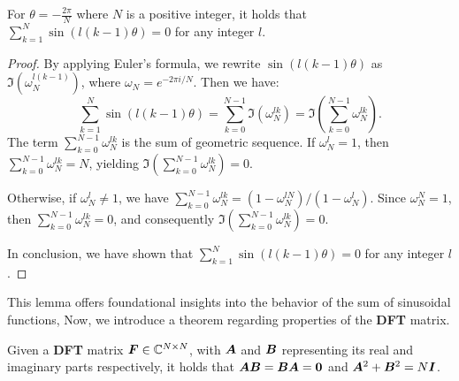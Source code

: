 \begin{lemma}
\label{lemma:1}
    For $\theta=-\frac{2\pi}{N}$ where $N$ is a positive integer, it holds that $\sum_{k=1}^{N}\sin\left(l\left(k-1\right)\theta\right)=0$ for any integer $l$.
\end{lemma}
\begin{proof}
By applying Euler's formula, we rewrite $\sin\left(l\left(k-1\right)\theta\right)$ as $\Im\left(\omega_N^{l(k-1)}\right)$, where $\omega_N=e^{-2\pi i/N}$. Then we have:
\begin{equation}
    \sum_{k=1}^{N} \sin\left(l\left(k-1\right)\theta\right) =\sum_{k=0}^{N-1} \Im \left(\omega_N^{lk}\right) = \Im \left( \sum_{k=0}^{N-1} \omega_N^{lk}\right).
\end{equation}
The term $\sum_{k=0}^{N-1} \omega_N^{lk}$ is the sum of geometric sequence. 
If $\omega_N^{l} = 1$, then $\sum_{k=0}^{N-1} \omega_N^{lk} = N$, yielding $\Im \left( \sum_{k=0}^{N-1} \omega_N^{lk}\right)=0$.

Otherwise, if $\omega_N^{l} \ne 1$, we have $\sum_{k=0}^{N-1} \omega_N^{lk} = \left(1-\omega_N^{lN}\right)/\left(1-\omega_N^{l}\right)$. Since $\omega_N^{N}=1$, then $\sum_{k=0}^{N-1} \omega_N^{lk} = 0$, and consequently $\Im \left( \sum_{k=0}^{N-1} \omega_N^{lk}\right)=0$.

In conclusion, we have shown that $\sum_{k=1}^{N} \sin\left(l\left(k-1\right)\theta\right)=0$ for any integer $l$.
\end{proof}
This lemma offers foundational insights into the behavior of the sum of sinusoidal functions,
Now, we introduce a theorem regarding properties of the \textbf{DFT} matrix.
\begin{theorem}
\label{theorem:1}
    Given a \textbf{DFT} matrix ${\bm{F}}\in \mathbb{C}^{N\times N}$, with ${\bm{A}}$ and ${\bm{B}}$ representing its real and imaginary parts respectively, it holds that ${\bm{A}}{\bm{B}}={\bm{B}}{\bm{A}}=\mathbf{0}$ and ${\bm{A}}^2+{\bm{B}}^2=N{\bm{I}}$.
\end{theorem}
